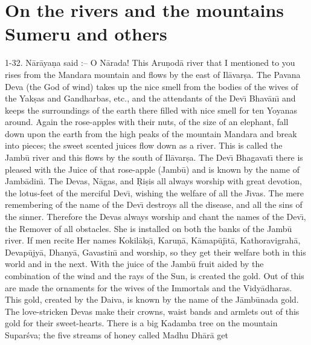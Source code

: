 \chapter{On the rivers and the mountains Sumeru and others}

1-32. N\=ar\=aya\d{n}a said :-- O N\=arada! This Aru\d{n}od\=a river that I mentioned to you rises from the Mandara mountain and flows by the east of Il\=avar\d{s}a. The Pavana Deva (the God of wind) takes up the nice smell from the bodies of the wives of the Yak\d{s}as and Gandharbas, etc., and the attendants of the Dev\={\i} Bhav\=an\={\i} and keeps the surroundings of the earth there filled with nice smell for ten Yoyanas around. Again the rose-apples with their nuts, of the size of an elephant, fall down upon the earth from the high peaks of the mountain Mandara and break into pieces; the sweet scented juices flow down as a river. This is called the Jamb\=u river and this flows by the south of Il\=avar\d{s}a. The Dev\={\i} Bhagavat\={\i} there is pleased with the Juice of that rose-apple (Jamb\=u) and is known by the name of Jamb\=adin\={\i}. The Devas, N\=agas, and \d{R}i\d{s}is all always worship with great devotion, the lotus-feet of the merciful Dev\={\i}, wishing the welfare of all the J\={\i}vas. The mere remembering of the name of the Dev\={\i} destroys all the disease, and all the sins of the sinner. Therefore the Devas always worship and chant the names of the Dev\={\i}, the Remover of all obstacles. She is installed on both the banks of the Jamb\=u river. If men recite Her names Kokil\=ak\d{s}\={\i}, Karu\d{n}\=a, K\=amap\=uj\={\i}t\=a, Kathoravigrah\=a, Devap\=ujy\=a, Dhany\=a, Gavastin\={\i} and worship, so they get their welfare both in this world and in the next. With the juice of the Jamb\=u fruit aided by the combination of the wind and the rays of the Sun, is created the gold. Out of this are made the ornaments for the wives of the Immortals and the Vidy\=adharas. This gold, created by the Daiva, is known by the name of the J\=amb\=unada gold. The love-stricken Devas make their crowns, waist bands and armlets out of this gold for their sweet-hearts. There is a big Kadamba tree on the mountain Supar\'sva; the five streams of honey called Madhu Dh\=ar\=a get

